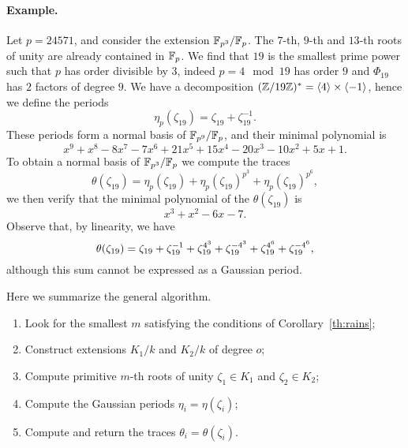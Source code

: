 \documentclass{article}
\begin{document}
\paragraph{Example.} Let $p=24571$, and consider the extension
$\mathbb{F}_{p^3}/\mathbb{F}_p$. The $7$-th, $9$-th and $13$-th roots of unity are
already contained in $\mathbb{F}_p$. We find that $19$ is the smallest prime
power such that $p$ has order divisible by $3$, indeed $p=4\mod 19$
has order $9$ and $\Phi_{19}$ has $2$ factors of degree $9$. We have
a decomposition
$(\mathbb{Z}/19\mathbb{Z})^\ast=\langle4\rangle\times\langle-1\rangle$, hence we
define the periods
\begin{equation}
  \eta_p(\zeta_{19}) = \zeta_{19} + \zeta_{19}^{-1}.
\end{equation}
These periods form a normal basis of $\mathbb{F}_{p^9}/\mathbb{F}_p$, and their
minimal polynomial is
\begin{equation}
  x^9 + x^8 - 8x^7 - 7x^6 + 21x^5 +
  15x^4 - 20x^3 - 10x^2 + 5x + 1.
\end{equation}
To obtain a normal basis of $\mathbb{F}_{p^3}/\mathbb{F}_p$ we compute the traces
\begin{equation}
  \theta(\zeta_{19}) = \eta_p(\zeta_{19}) + \eta_p(\zeta_{19})^{p^3} + \eta_p(\zeta_{19})^{p^6},
\end{equation}
we then verify that the minimal polynomial of the $\theta(\zeta_{19})$ is 
\begin{equation}
  x^3 + x^2 - 6x - 7.
\end{equation}
Observe that, by linearity, we have
\begin{equation}
  \def\z{\zeta_{19}}
  \theta(\zeta_{19}) = \z + \z^{-1} + \z^{4^3} + \z^{-4^3} + \z^{4^6} + \z^{-4^6},
\end{equation}
although this sum cannot be expressed as a Gaussian period.

Here we summarize the general algorithm.

\begin{enumerate}
\item Look for the smallest $m$ satisfying the conditions of
  Corollary~\ref{th:rains};
\item Construct extensions $K_1/k$ and $K_2/k$ of degree $o$;
\item Compute primitive $m$-th roots of unity $\zeta_1\in K_1$ and
  $\zeta_2\in K_2$;
\item Compute the Gaussian periods $\eta_i=\eta(\zeta_i)$;
\item Compute and return the traces $\theta_i=\theta(\zeta_i)$.
\end{enumerate}
\end{document}
